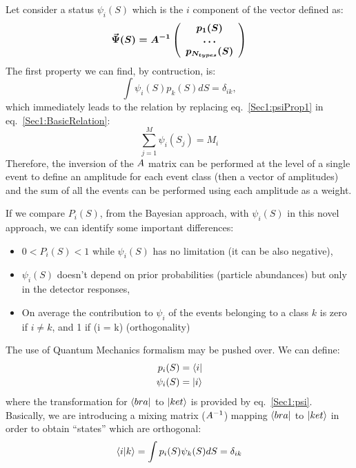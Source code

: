 Let consider a status $\psi_{i}(S)$ which is the $i$ component of the vector
defined as:
\begin{equation}
\label{Sec1:psi}
\vec{\Psi}(S) = \boldmath{A^{-1}} 
\left(
\begin{array}{c}
p_{1}(S)\\
\ldots \\
p_{N_{types}}(S)
\end{array}
\right)
\end{equation}
The first property we can find, by contruction, is:
\begin{equation}
\label{Sec1:psiProp1}
\int \psi_{i}(S) p_{k}(S) dS = \delta_{ik},
\end{equation}
which immediately leads to the relation by replacing eq.~\ref{Sec1:psiProp1} in eq.~\ref{Sec1:BasicRelation}:
\begin{equation}
\label{Sec1:psi}
\sum\limits_{j=1}^{M}\psi_{i}(S_j) = M_{i}
\end{equation}
Therefore, the inversion of the $\boldmath{A}$ matrix can be performed at the
level of a single event to define an amplitude for each event class (then a
vector of amplitudes) and the sum of all the events can be performed using
each amplitude as a weight.

If we compare $P_{i}(S)$, from the Bayesian approach, with $\psi_{i}(S)$ in
this novel approach, we can identify some important differences:
\begin{itemize}
\item $0 < P_{i}(S) < 1$ while $\psi_{i}(S)$ has no limitation (it can be also
  negative),\\
\item $\psi_{i}(S)$ doesn't depend on prior probabilities (particle
  abundances) but only in the detector responses,\\
\item On average the contribution to
  $\psi_{i}$ of the events belonging to a class $k$ is zero if $i \neq k$, and
  1 if (i = k) (orthogonality)
\end{itemize}

The use of Quantum Mechanics formalism may be pushed over.
We can define:
\begin{eqnarray}
\label{Sec1:QMdef1}
p_{i}(S) = \bra{i} \\
\psi_{i}(S) = \ket{i}
\end{eqnarray}
where the transformation for $\bra{bra}$ to $\ket{ket}$ is provided by eq.~\ref{Sec1:psi}.
Basically, we are introducing a mixing matrix ($\boldmath{A^{-1}}$) mapping $\bra{bra}$
to $\ket{ket}$ in order to obtain ``states'' which are orthogonal:
\begin{equation}
\label{Sec1:Orto}
\braket{i|k} = \int p_{i}(S) \psi_{k}(S) dS = \delta_{ik}
\end{equation}

